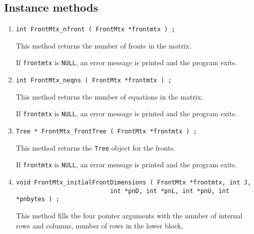 \subsection{Instance methods}
\label{subsection:FrontMtx:proto:instance}
\par
\begin{enumerate}
\item
\begin{verbatim}
int FrontMtx_nfront ( FrontMtx *frontmtx ) ;
\end{verbatim}
This method returns the number of fronts in the matrix.
\par {}
If {\tt frontmtx} is {\tt NULL},
an error message is printed and the program exits.
\item
\begin{verbatim}
int FrontMtx_neqns ( FrontMtx *frontmtx ) ;
\end{verbatim}
This method returns the number of equations in the matrix.
\par {}
If {\tt frontmtx} is {\tt NULL},
an error message is printed and the program exits.
\item
\begin{verbatim}
Tree * FrontMtx_frontTree ( FrontMtx *frontmtx ) ;
\end{verbatim}
This method returns the {\tt Tree} object for the fronts.
\par {}
If {\tt frontmtx} is {\tt NULL},
an error message is printed and the program exits.
\item
\begin{verbatim}
void FrontMtx_initialFrontDimensions ( FrontMtx *frontmtx, int J,
                          int *pnD, int *pnL, int *pnU, int *pnbytes ) ;
\end{verbatim}
This method fills the four pointer arguments with the number of 
internal rows and columns, number of rows in the lower block,

\end{enumerate}
